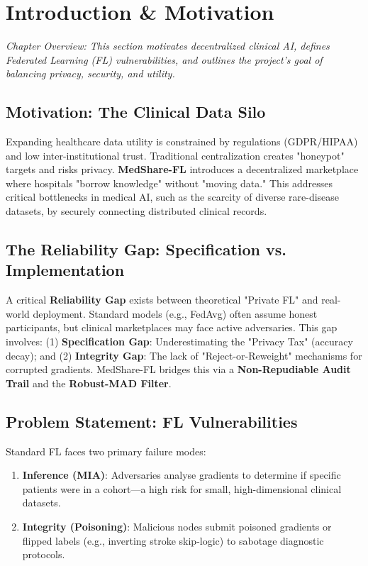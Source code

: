 \documentclass[10pt, a4paper, twocolumn]{article}
\begin{document}
\section{Introduction \& Motivation}

\textit{Chapter Overview: This section motivates decentralized clinical AI, defines Federated Learning (FL) vulnerabilities, and outlines the project's goal of balancing privacy, security, and utility.}

\subsection{Motivation: The Clinical Data Silo}
Expanding healthcare data utility is constrained by regulations (GDPR/HIPAA) and low inter-institutional trust. Traditional centralization creates "honeypot" targets and risks privacy. \textbf{MedShare-FL} introduces a decentralized marketplace where hospitals "borrow knowledge" without "moving data." This addresses critical bottlenecks in medical AI, such as the scarcity of diverse rare-disease datasets, by securely connecting distributed clinical records.

\subsection{The Reliability Gap: Specification vs. Implementation}
A critical \textbf{Reliability Gap} exists between theoretical "Private FL" and real-world deployment. Standard models (e.g., FedAvg) often assume honest participants, but clinical marketplaces may face active adversaries. This gap involves: (1) \textbf{Specification Gap}: Underestimating the "Privacy Tax" (accuracy decay); and (2) \textbf{Integrity Gap}: The lack of "Reject-or-Reweight" mechanisms for corrupted gradients. MedShare-FL bridges this via a \textbf{Non-Repudiable Audit Trail} and the \textbf{Robust-MAD Filter}.

\subsection{Problem Statement: FL Vulnerabilities}
Standard FL faces two primary failure modes:
\begin{enumerate}[leftmargin=*, nosep]
    \item \textbf{Inference (MIA)}: Adversaries analyse gradients to determine if specific patients were in a cohort—a high risk for small, high-dimensional clinical datasets.
    \item \textbf{Integrity (Poisoning)}: Malicious nodes submit poisoned gradients or flipped labels (e.g., inverting stroke skip-logic) to sabotage diagnostic protocols.
\end{enumerate}
\end{document}
